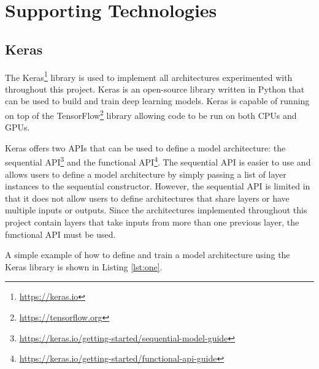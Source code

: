 \section{Supporting Technologies}

\subsection{Keras}

The Keras\footnote{\url{https://keras.io}} library is used to implement all architectures experimented with throughout this project. Keras is an open-source library written in Python that can be used to build and train deep learning models. Keras is capable of running on top of the TensorFlow\footnote{\url{https://tensorflow.org}} library allowing code to be run on both CPUs and GPUs.

Keras offers two APIs that can be used to define a model architecture: the sequential API\footnote{\url{https://keras.io/getting-started/sequential-model-guide}} and the functional API\footnote{\url{https://keras.io/getting-started/functional-api-guide}}. The sequential API is easier to use and allows users to define a model architecture by simply passing a list of layer instances to the sequential constructor. However, the sequential API is limited in that it does not allow users to define architectures that share layers or have multiple inputs or outputs. Since the architectures implemented throughout this project contain layers that take inputs from more than one previous layer, the functional API must be used.

A simple example of how to define and train a model architecture using the Keras library is shown in Listing \ref{lst:one}.

